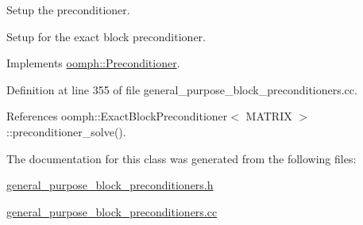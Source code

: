Setup the preconditioner. 

Setup for the exact block preconditioner. 

Implements \hyperlink{classoomph_1_1Preconditioner_af4886f4efe510e5c9b0eb19422943588}{oomph\+::\+Preconditioner}.



Definition at line 355 of file general\+\_\+purpose\+\_\+block\+\_\+preconditioners.\+cc.



References oomph\+::\+Exact\+Block\+Preconditioner$<$ M\+A\+T\+R\+I\+X $>$\+::preconditioner\+\_\+solve().



The documentation for this class was generated from the following files\+:\begin{DoxyCompactItemize}
\item 
\hyperlink{general__purpose__block__preconditioners_8h}{general\+\_\+purpose\+\_\+block\+\_\+preconditioners.\+h}\item 
\hyperlink{general__purpose__block__preconditioners_8cc}{general\+\_\+purpose\+\_\+block\+\_\+preconditioners.\+cc}\end{DoxyCompactItemize}
